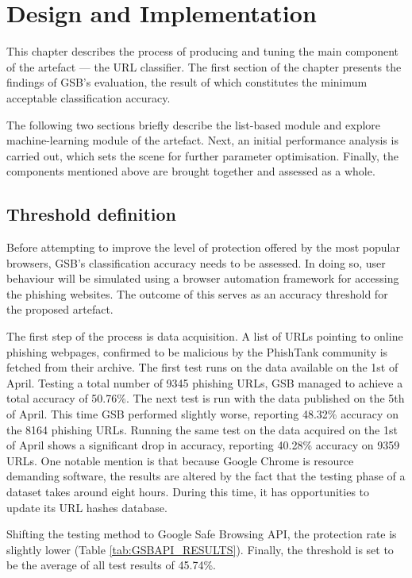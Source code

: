 
\chapter{Design and Implementation}
\label{chap:design_and_implementation}
This chapter describes the process of producing and tuning the main component of the artefact --- the URL classifier. The first section of the chapter presents the findings of GSB's evaluation, the result of which constitutes the minimum acceptable classification accuracy.

The following two sections briefly describe the list-based module and explore machine-learning module of the artefact. Next, an initial performance analysis is carried out, which sets the scene for further parameter optimisation. Finally, the components mentioned above are brought together and assessed as a whole.

\section{Threshold definition}
Before attempting to improve the level of protection offered by the most popular browsers, GSB's classification accuracy needs to be assessed. In doing so, user behaviour will be simulated using a browser automation framework for accessing the phishing websites. The outcome of this serves as an accuracy threshold for the proposed artefact.

The first step of the process is data acquisition. A list of URLs pointing to online phishing webpages, confirmed to be malicious by the PhishTank community is fetched from their archive. The first test runs on the data available on the 1st of April. Testing a total number of 9345 phishing URLs, GSB managed to achieve a total accuracy of 50.76\%.
The next test is run with the data published on the 5th of April. This time GSB performed slightly worse, reporting 48.32\% accuracy on the 8164 phishing URLs. Running the same test on the data acquired on the 1st of April shows a significant drop in accuracy, reporting 40.28\% accuracy on 9359 URLs.
One notable mention is that because Google Chrome is resource demanding software, the results are altered by the fact that the testing phase of a dataset takes around eight hours. During this time, it has opportunities to update its URL hashes database.

Shifting the testing method to Google Safe Browsing API, the protection rate is slightly lower (Table \ref{tab:GSBAPI_RESULTS}). Finally, the threshold is set to be the average of all test results of 45.74\%.


